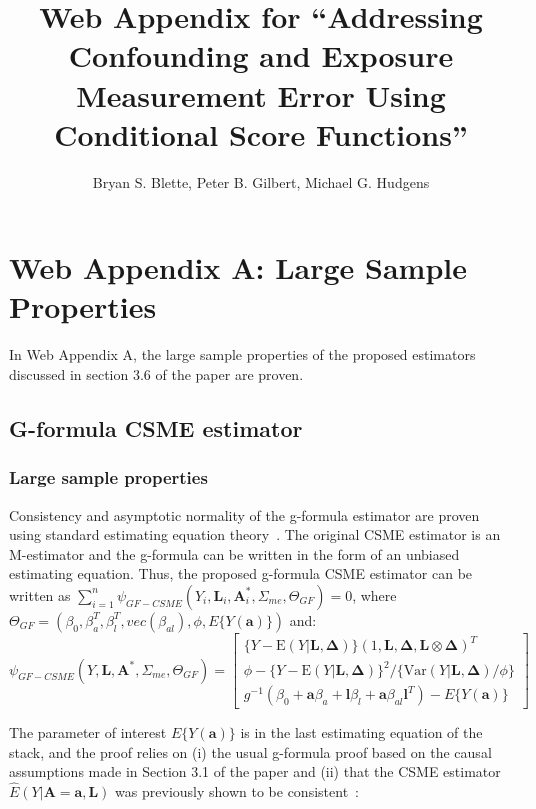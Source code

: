 \documentclass[12pt]{article}
\title{Web Appendix for ``Addressing Confounding and Exposure Measurement Error Using Conditional Score Functions''}
\author{Bryan S. Blette, Peter B. Gilbert, Michael G. Hudgens}
\date{}
\begin{document}


\maketitle

\section{Web Appendix A: Large Sample Properties}

In Web Appendix A, the large sample properties of the proposed estimators discussed in section 3.6 of the paper are proven.

\subsection{G-formula CSME estimator}

\subsubsection{Large sample properties}

Consistency and asymptotic normality of the g-formula estimator are proven using standard estimating equation theory~\citep{stefanski2002}. The original CSME estimator is an M-estimator and the g-formula can be written in the form of an unbiased estimating equation. Thus, the proposed g-formula CSME estimator can be written as $\sum_{i=1}^{n} \psi_{GF-CSME}(Y_{i}, \bm{L}_{i}, \bm{A}^{*}_{i}, \Sigma_{me}, \Theta_{GF}) = 0$, where $\Theta_{GF} = (\beta_{0}, \beta^{T}_{a}, \beta^{T}_{l}, vec(\beta_{al}), \phi, E \{ Y(\bm{a}) \})$ and:
\begin{equation*}
    \psi_{GF-CSME}(Y, \bm{L}, \bm{A}^{*}, \Sigma_{me}, \Theta_{GF}) =
    \begin{bmatrix}
       \{ Y - \text{E}(Y | \bm{L}, \bm{\Delta}) \} (1, \bm{L}, \bm{\Delta}, \bm{L} \otimes \bm{\Delta})^{T} \\
        \phi - \{ Y - \text{E}(Y | \bm{L}, \bm{\Delta}) \}^{2} / \{ \text{Var}(Y | \bm{L}, \bm{\Delta}) / \phi \} \\
        g^{-1}(\beta_{0} + \bm{a}\beta_{a} + \bm{l}\beta_{l} +
        \bm{a}\beta_{al}\bm{l}^{T}) - E \{ Y(\bm{a}) \}
    \end{bmatrix}
\end{equation*}

The parameter of interest $E \{ Y(\bm{a}) \}$ is in the last estimating equation of the stack, and the proof relies on (i) the usual g-formula proof based on the causal assumptions made in Section 3.1 of the paper and (ii) that the CSME estimator $\hat{E}(Y | \bm{A} = \bm{a}, \bm{L})$ was previously shown to be consistent~\citep{carroll2006}:
\end{document}
